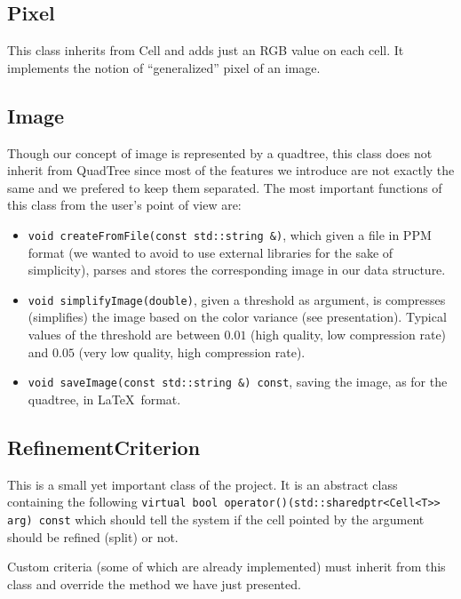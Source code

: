 \documentclass[a4paper,10pt]{article}
\begin{document}
\subsection{Pixel}
This class inherits from Cell and adds just an RGB value on each cell. It implements the notion of ``generalized'' pixel of an image.

\subsection{Image}
Though our concept of image is represented by a quadtree, this class does not inherit from QuadTree since most of the features we introduce are not exactly the same and we prefered to keep them separated.
The most important functions of this class from the user's point of view are:
\begin{itemize}
 \item \texttt{void createFromFile(const std::string \&)}, which given a file in PPM format (we wanted to avoid to use external libraries for the sake of simplicity), parses and stores the corresponding image in our data structure.
 \item \texttt{void simplifyImage(double)}, given a threshold as argument, is compresses (simplifies) the image based on the color variance (see presentation). Typical values of the threshold are between $0.01$ (high quality, low compression rate) and $0.05$ (very low quality, high compression rate).
 \item \texttt{void saveImage(const std::string \&) const}, saving the image, as for the quadtree, in \LaTeX~format.
\end{itemize}

\subsection{RefinementCriterion}
This is a small yet important class of the project. It is an abstract class containing the following \texttt{virtual bool operator()(std::shared\textunderscore ptr<Cell<T>> arg) const} which should tell the system if the cell pointed by the argument should be refined (split) or not.

Custom criteria (some of which are already implemented) must inherit from this class and override the method we have just presented.
\end{document}
